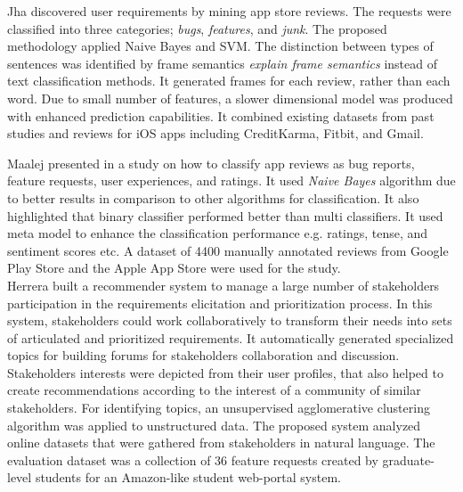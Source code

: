 Jha \etal \cite{Jha:2017} discovered user requirements by mining app store reviews. The requests were classified into three categories;
\emph{bugs}, \emph{features}, and \emph{junk}. The proposed methodology applied Naive Bayes and SVM. The distinction between types of sentences was identified by frame semantics \emph{explain frame semantics} instead of text classification methods. It generated frames for each review, rather than each word. Due to small number of features, a slower dimensional model was produced with enhanced prediction capabilities. It combined existing
datasets from past studies and reviews for iOS apps including CreditKarma,
Fitbit, and Gmail.

Maalej presented in \cite{Maalej} a study on how to classify app reviews as bug
reports, feature requests, user experiences, and ratings. It used
\emph{Naive Bayes} algorithm due to better results in comparison to other algorithms for classification. It also highlighted that binary
classifier performed better than multi
classifiers. It used meta model to enhance the classification performance e.g. ratings,
tense, and sentiment scores etc. A
dataset of 4400 manually annotated reviews from Google Play Store and the Apple App
Store were used for the study.\\

Herrera \etal \cite{Castro-Herrera:2009} built a recommender system to manage a large number of stakeholders participation in
the requirements elicitation and prioritization process. In this system, stakeholders could work collaboratively to transform their needs into sets
of articulated and prioritized requirements. It automatically
generated specialized topics for building forums for stakeholders collaboration and discussion. Stakeholders interests were depicted from their user profiles, that also helped to create recommendations according to the
interest of a community of similar stakeholders. For identifying topics, an unsupervised agglomerative clustering algorithm was
applied to unstructured data. The proposed system analyzed online
datasets that were gathered from stakeholders in natural language. 
The evaluation dataset was a collection of 36 feature requests created by
graduate-level students for an Amazon-like student web-portal system.






